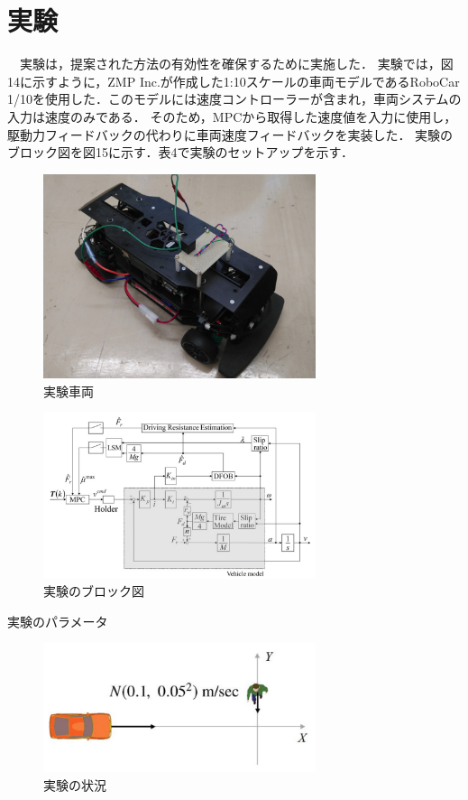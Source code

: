 \chapter{実験}
　実験は，提案された方法の有効性を確保するために実施した． 実験では，図14に示すように，ZMP Inc.が作成した1:10スケールの車両モデルであるRoboCar 1/10を使用した．このモデルには速度コントローラーが含まれ，車両システムの入力は速度のみである． そのため，MPCから取得した速度値を入力に使用し，駆動力フィードバックの代わりに車両速度フィードバックを実装した． 実験のブロック図を図15に示す．表4で実験のセットアップを示す．
\begin{figure}[H]
    \centering
    \includegraphics[width=8cm]{./fig/fig14.png}
    \caption{実験車両}
\end{figure}
\begin{figure}[H]
    \centering
    \includegraphics[width=8cm]{./fig/fig15.png}
    \caption{実験のブロック図}
\end{figure}

\begin{table}[htbp]
    \centering
    \caption{実験のパラメータ}
    \scalebox{0.81} {
        
    }
\end{table}


\begin{figure}[H]
    \centering
    \includegraphics[width=8cm]{./fig/fig16.png}
    \caption{実験の状況}
\end{figure}

